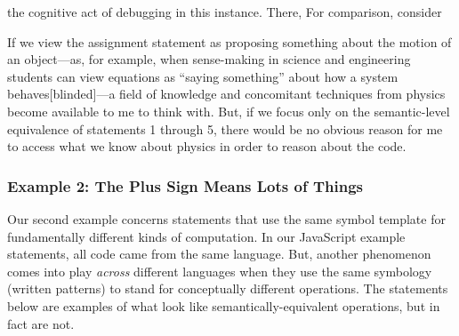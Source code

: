 the cognitive act of debugging in this instance.    There,  For comparison, consider

 If we view the assignment statement as proposing
something about the motion of an object---as, for example, when sense-making in science and engineering students can view equations as ``saying something'' about how a system behaves[blinded]---a
field of knowledge and concomitant techniques from physics become
available to me to think with. But, if we focus only on the
semantic-level equivalence of statements 1 through 5, there would be no
obvious reason for me to access what we know about physics in order to
reason about the code.

\subsubsection{Example 2: The Plus Sign Means Lots of Things}

Our second example concerns statements that use the same symbol template for fundamentally different kinds of computation. In our JavaScript example statements, all code came from the same language. But, another phenomenon comes
into play \emph{across} different languages when they use the same symbology (written patterns) to stand for
conceptually different operations. The statements below are examples of what look
like semantically-equivalent operations, but in fact are not.

\begin{Shaded}
\begin{Highlighting}[]
\end{Highlighting}
\end{Shaded}

\begin{Shaded}
\begin{Highlighting}[]
\OperatorTok{=} \OperatorTok{+} 
\end{Highlighting}
\end{Shaded}

\begin{Shaded}
\begin{Highlighting}[]
\StringTok{ }\StringTok{ }\NormalTok{()}
\end{Highlighting}
\end{Shaded}


